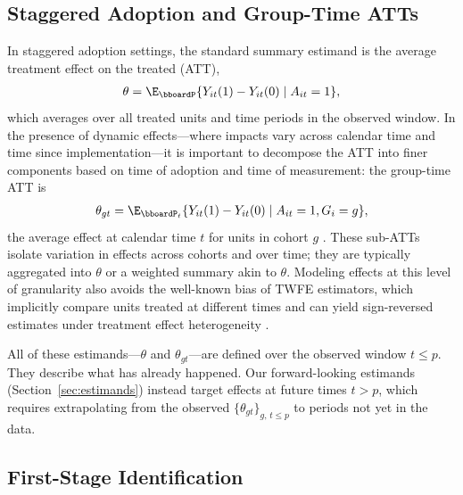 \documentclass{article}
\renewcommand{\P}{\bboardP}
\begin{document}
\subsection{Staggered Adoption and Group-Time ATTs}

In staggered adoption settings, the standard summary estimand is the average treatment effect on the treated (ATT),
\begin{align}
    \theta = \E_{\P}\{Y_{it}(1) - Y_{it}(0) \mid A_{it} = 1\},
    \label{eq:att}
\end{align}
which averages over all treated units and time periods in the observed window. In the presence of dynamic effects---where impacts vary across calendar time and time since implementation---it is important to decompose the ATT into finer components based on time of adoption and time of measurement: the group-time ATT is
\begin{align}
    \theta_{gt} = \E_{\P_t}\{Y_{it}(1) - Y_{it}(0) \mid A_{it} = 1, G_i = g\},
    \label{eq:gt-att}
\end{align}
the average effect at calendar time $t$ for units in cohort $g$ \citep{callawayDifferenceindifferencesMultipleTime2021,sunEstimatingDynamicTreatment2021}. These sub-ATTs isolate variation in effects across cohorts and over time; they are typically aggregated into $\theta$ or a weighted summary akin to $\theta$. Modeling effects at this level of granularity also avoids the well-known bias of TWFE estimators, which implicitly compare units treated at different times and can yield sign-reversed estimates under treatment effect heterogeneity \citep{sunEstimatingDynamicTreatment2021}.

All of these estimands---$\theta$ and $\theta_{gt}$---are defined over the observed window $t \leq p$. They describe what has already happened. Our forward-looking estimands (Section~\ref{sec:estimands}) instead target effects at future times $t > p$, which requires extrapolating from the observed $\{\theta_{gt}\}_{g,\, t \leq p}$ to periods not yet in the data.

\subsection{First-Stage Identification}
\end{document}
